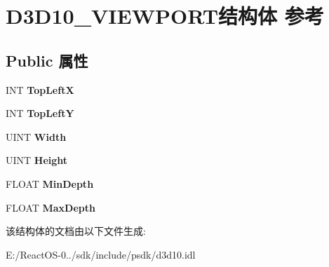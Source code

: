 \hypertarget{struct_d3_d10___v_i_e_w_p_o_r_t}{}\section{D3\+D10\+\_\+\+V\+I\+E\+W\+P\+O\+R\+T结构体 参考}
\label{struct_d3_d10___v_i_e_w_p_o_r_t}
\subsection*{Public 属性}
\begin{DoxyCompactItemize}
\item 
\mbox{\label{struct_d3_d10___v_i_e_w_p_o_r_t_a269faafa0e28221edbdd19be3e09d13a}} 
I\+NT {\bfseries Top\+LeftX}
\item 
\mbox{\label{struct_d3_d10___v_i_e_w_p_o_r_t_a7b311eade04a0b928b4f2498dcc2e388}} 
I\+NT {\bfseries Top\+LeftY}
\item 
\mbox{\label{struct_d3_d10___v_i_e_w_p_o_r_t_a14e06e3f6c1c59213081afd97385dc8f}} 
U\+I\+NT {\bfseries Width}
\item 
\mbox{\label{struct_d3_d10___v_i_e_w_p_o_r_t_a73f91ccb3956194cc8564784c0320567}} 
U\+I\+NT {\bfseries Height}
\item 
\mbox{\label{struct_d3_d10___v_i_e_w_p_o_r_t_a573e85e742320630dbaa69b2cbbe74e8}} 
F\+L\+O\+AT {\bfseries Min\+Depth}
\item 
\mbox{\label{struct_d3_d10___v_i_e_w_p_o_r_t_ada89d6e8cba9b198dde4e4cd58362b91}} 
F\+L\+O\+AT {\bfseries Max\+Depth}
\end{DoxyCompactItemize}


该结构体的文档由以下文件生成\+:\begin{DoxyCompactItemize}
\item 
E\+:/\+React\+O\+S-\/0../sdk/include/psdk/d3d10.\+idl\end{DoxyCompactItemize}
